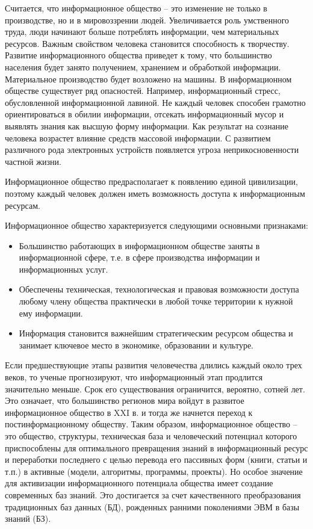 Считается, что информационное общество – это изменение не только в производстве, но и в мировоззрении людей. Увеличивается роль умственного труда, люди начинают больше потреблять информации, чем материальных ресурсов. Важным свойством человека становится способность к творчеству. Развитие информационного общества приведет к тому, что большинство населения будет занято получением, хранением и обработкой информации. Материальное производство будет возложено на машины.
В информационном обществе существует ряд опасностей. Например, информационный стресс, обусловленной информационной лавиной. Не каждый человек способен грамотно ориентироваться в обилии информации, отсекать информационный мусор и выявлять знания как высшую форму информации. Как результат на сознание человека возрастет влияние средств массовой информации. С развитием различного рода электронных устройств появляется угроза неприкосновенности частной жизни.

Информационное общество предрасполагает к появлению единой цивилизации, поэтому каждый человек должен иметь возможность доступа к информационным ресурсам.

Информационное общество характеризуется следующими основными признаками:
\begin{itemize}
\item Большинство работающих в информационном обществе заняты в информационной сфере, т.е. в сфере производства информации и информационных услуг.

\item Обеспечены техническая, технологическая и правовая возможности доступа любому члену общества практически в любой точке территории к нужной ему информации.

\item Информация становится важнейшим стратегическим ресурсом общества и занимает ключевое место в экономике, образовании и культуре.
\end{itemize}
Если предшествующие этапы развития человечества длились каждый около трех веков, то ученые прогнозируют, что информационный этап продлится значительно меньше. Срок его существования ограничится, вероятно, сотней лет. Это означает, что большинство регионов мира войдут в развитое информационное общество в XXI в. и тогда же начнется переход к постинформационному обществу.
Таким образом, информационное общество – это общество, структуры, техническая база и человеческий потенциал которого приспособлены для оптимального превращения знаний в информационный ресурс и переработки последнего с целью перевода его пассивных форм (книги, статьи и т.п.) в активные (модели, алгоритмы, программы, проекты). Но особое значение для активизации информационного потенциала общества имеет создание современных баз знаний. Это достигается за счет качественного преобразования традиционных баз данных (БД), рожденных ранними поколениями ЭВМ в базы знаний (БЗ).


